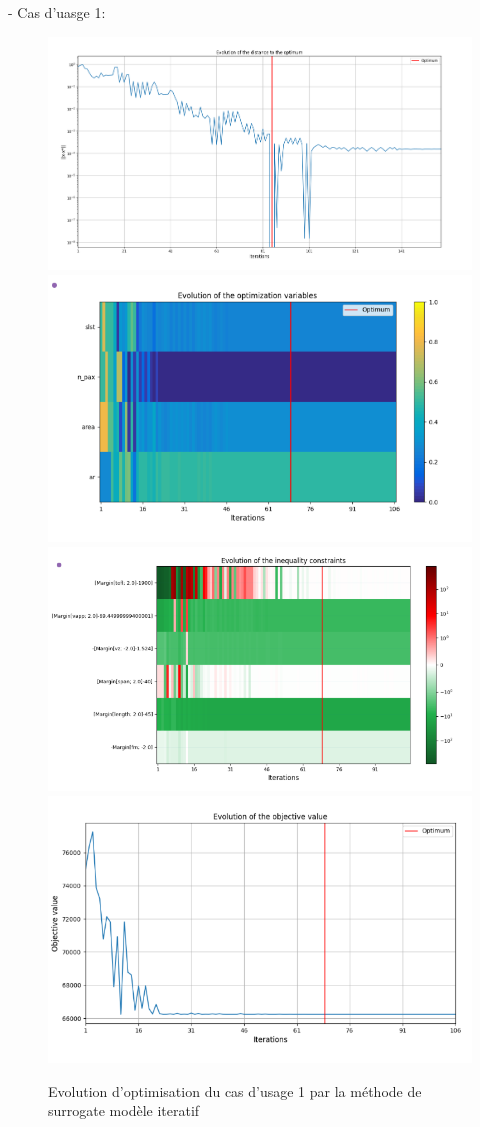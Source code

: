 \documentclass[a4paper, 11pt]{article}
\begin{document}
- Cas d'uasge 1: 
\begin{figure}[H]
    \centering
    \includegraphics[width=0.45\linewidth]{Images_case_1/p3u1_surrogate.png}
    \includegraphics[width=0.45\linewidth]{Images_case_1/p3u1_surrogate1.png}
    \includegraphics[width=0.45\linewidth]{Images_case_1/p3u1_surrogate2.png}
    \includegraphics[width=0.45\linewidth]{Images_case_1/p3u1_surrogate3.png}
    \caption{Evolution d'optimisation du cas d'usage 1 par la méthode de surrogate modèle iteratif}
    \label{fig:p3u2_iter_c1}
\end{figure}
\end{document}
